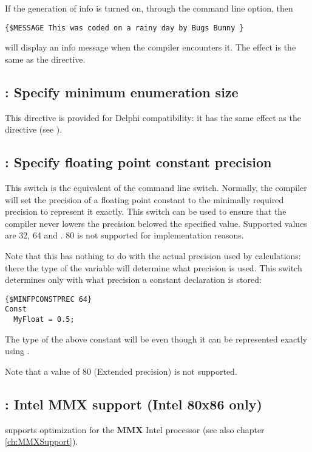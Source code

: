 If the generation of info is turned on, through the  command line
option, then
\begin{verbatim}
{$MESSAGE This was coded on a rainy day by Bugs Bunny }
\end{verbatim}
will display an info message when the compiler encounters it. The effect is
the same as the  directive.

\subsection{ : Specify minimum enumeration size}

This directive is provided for Delphi compatibility: it has the same effect
as the  directive (see ).

\subsection{ : Specify floating point constant precision}
\label{se:Minfpconstprec}

This switch is the equivalent of the  command line switch. Normally, the compiler will set the precision of a floating point constant to the minimally required precision to represent it exactly. This switch can be used to ensure that the compiler never lowers the precision belowed the specified value.
Supported values are 32, 64 and . 
80 is not supported for implementation reasons.

Note that this has nothing to do with the actual precision used by
calculations: there the type of the variable will determine what precision
is used. This switch determines only with what precision a constant 
declaration is stored:
\begin{verbatim}
{$MINFPCONSTPREC 64}
Const
  MyFloat = 0.5;
\end{verbatim}
The type of the above constant will be  even though it can be represented exactly using .

Note that a value of 80 (Extended precision) is not supported.

\subsection{ : Intel MMX support (Intel 80x86 only)}

\fpc supports optimization for the \textbf{MMX} Intel
processor (see also chapter \ref{ch:MMXSupport}).


